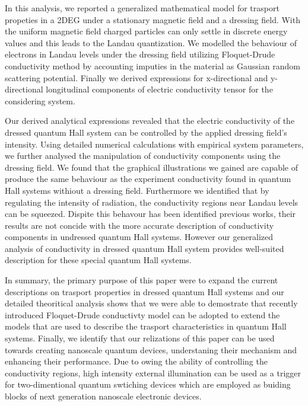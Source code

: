 In this analysis, we reported a generalized mathematical model for trasport propeties in a 2DEG under a stationary magnetic field and a dressing field. With the uniform magnetic field charged particles can only settle in discrete energy values and this leads to the Landau quantization. We modelled the behaviour of electrons in Landau levels under the dressing field utilizing Floquet-Drude conductivity method by accounting imputies in the material as Gaussian random scattering potential. Finally we derived expressions for x-directional and y-directional longitudinal components of electric conductivity tensor for the considering system.

Our derived analytical expressions revealed that the electric conductivity of the dressed quantum Hall system can be controlled by the applied dressing field’s intensity. Using detailed numerical calculations with empirical system parameters, we further analysed the manipulation of conductivity components using the dressing field. We found that the graphical illustrations we gained are capable of produce the same behaviour as the experiment conductivity found in quantum Hall systems withiout a dressing field. Furthermore we identified that by regulating the intensity of radiation, the conductivity regions near Landau levels can be squeezed. Dispite this behavour has been identified previous works, their results are not concide with the more accurate description of conductivity components in undressed quantum Hall systems. However our generalized analysis of conductivity in dressed quantum Hall system provides well-suited description for  these special quantum Hall systems.

In summary, the primary purpose of this paper were to expand the current descriptions on trasport properties in dressed quantum Hall systems and our  detailed theoritical analysis shows that we were able to demostrate that recently introduced Floquet-Drude conductivty model can be adopted to extend the models that are used to describe the trasport characteristics in quantum Hall systems. Finally, we identify that our relizations of this paper can be used towards creating nanoscale quantum devices, understaning their mechanism and enhancing their performance. Due to owing the ability of controlling the conductivity regions, high intensity external illumination can be used as a trigger for two-dimentional quantum swtiching devices which are employed as buiding blocks of next generation nanoscale electronic devices.
